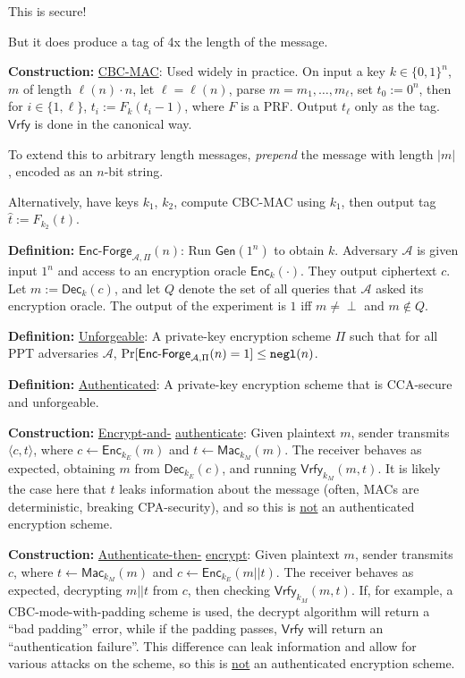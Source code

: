 \documentclass[10pt]{article}
\newcommand{\AAA}{\mathcal{A}}
\newcommand{\defn}[1]{{\bf Definition:} \underline{#1}}
\newcommand{\con}[1]{{\bf Construction:} \underline{#1}}
\newcommand{\Enc}{\mathsf{Enc}}
\newcommand{\Dec}{\mathsf{Dec}}
\newcommand{\Mac}{\mathsf{Mac}}
\newcommand{\Vrfy}{\mathsf{Vrfy}}
\newcommand{\Gen}{\mathsf{Gen}}
\newcommand{\ang}[1]{\langle#1\rangle}
\newcommand{\ExptEncfArgs}[2]{\mathsf{Enc\text{-}Forge}_{#1,#2}}
\newcommand{\ExptEncf}{\ExptEncfArgs{\AAA}{\Pi}}
\newcommand{\negl}{{\tt negl}}
\newcommand{\from}{\leftarrow}
\begin{document}
\begin{multicols}{5}
This is secure!

But it does produce a tag of 4x the length of the message.

\con{CBC-MAC}: Used widely in practice. On input a key $k\in\{0,1\}^n$, $m$ of length $\ell(n)\cdot n$, let $\ell=\ell(n)$, parse $m=m_1,\dots,m_\ell$, set $t_0:=0^n$, then for $i\in\{1,\ell\}$, $t_i:=F_k(t_i-1)$, where $F$ is a PRF. Output $t_\ell$ only as the tag. $\Vrfy$ is done in the canonical way.

To extend this to arbitrary length messages, {\it prepend} the message with length $|m|$, encoded as an $n$-bit string.

Alternatively, have keys $k_1$, $k_2$, compute CBC-MAC using $k_1$, then output tag $\hat{t}:=F_{k_2}(t)$.

\defn{$\ExptEncf(n)$}: Run $\Gen(1^n)$ to obtain $k$. Adversary $\AAA$ is given input $1^n$ and access to an encryption oracle $\Enc_k(\cdot)$. They output ciphertext $c$. Let $m:=\Dec_k(c)$, and let $Q$ denote the set of all queries that $\AAA$ asked its encryption oracle. The output of the experiment is $1$ iff $m\neq\perp$ and $m\not\in Q$.

\defn{Unforgeable}: A private-key encryption scheme $\Pi$ such that for all PPT adversaries $\AAA$, $\Pr[\ExptEncf(n)=1]\leq\negl(n)$.

\defn{Authenticated}: A private-key encryption scheme that is CCA-secure and unforgeable.

\con{Encrypt-and-} \underline{authenticate}: Given plaintext $m$, sender transmits $\ang{c,t}$, where $c\from\Enc_{k_E}(m)$ and $t\from\Mac_{k_M}(m)$. The receiver behaves as expected, obtaining $m$ from $\Dec_{k_E}(c)$, and running $\Vrfy_{k_M}(m,t)$. It is likely the case here that $t$ leaks information about the message (often, MACs are deterministic, breaking CPA-security), and so this is \underline{not} an authenticated encryption scheme.

\con{Authenticate-then-} \underline{encrypt}: Given plaintext $m$, sender transmits $c$, where $t\from\Mac_{k_M}(m)$ and $c\from\Enc_{k_E}(m||t)$. The receiver behaves as expected, decrypting $m||t$ from $c$, then checking $\Vrfy_{k_M}(m,t)$. If, for example, a CBC-mode-with-padding scheme is used, the decrypt algorithm will return a ``bad padding'' error, while if the padding passes, $\Vrfy$ will return an ``authentication failure''. This difference can leak information and allow for various attacks on the scheme, so this is \underline{not} an authenticated encryption scheme.


\end{multicols}
\end{document}
